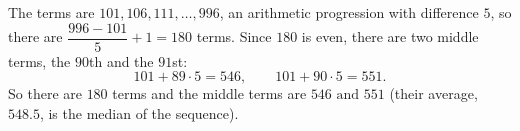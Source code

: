 The terms are $101,106,111,\dots,996$, an arithmetic progression with difference $5$, so there are $\dfrac{996-101}{5}+1=180$ terms. Since $180$ is even, there are two middle terms, the $90$th and the $91$st:
\[
101+89\cdot5=546,\qquad 101+90\cdot5=551 .
\]
So there are $\boxed{180}$ terms and the middle terms are $\boxed{546\text{ and }551}$ (their average, $548.5$, is the median of the sequence).
